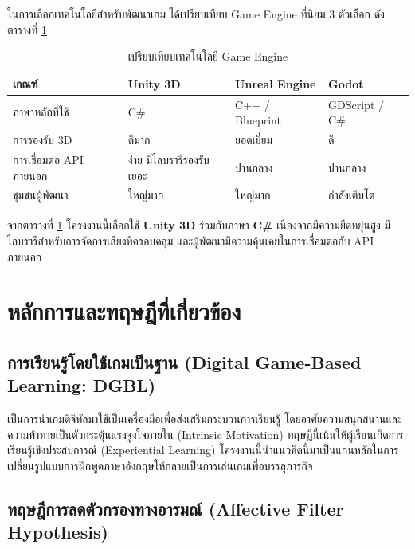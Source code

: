 {\sloppy
ในการเลือกเทคโนโลยีสำหรับพัฒนาเกม ได้เปรียบเทียบ Game Engine ที่นิยม 3 ตัวเลือก ดังตารางที่ \ref{tab:compare_engine}
}

\begin{table}[H]
\centering
\caption{เปรียบเทียบเทคโนโลยี Game Engine}
\label{tab:compare_engine}
\begin{tabular}{|p{3cm}|p{3.5cm}|p{3.5cm}|p{3cm}|}
\hline
\textbf{เกณฑ์} & \textbf{Unity 3D} & \textbf{Unreal Engine} & \textbf{Godot} \\
\hline
ภาษาหลักที่ใช้ & C\# & C++ / Blueprint & GDScript / C\# \\ \hline
การรองรับ 3D & ดีมาก & ยอดเยี่ยม & ดี \\ \hline
การเชื่อมต่อ API ภายนอก & ง่าย มีไลบรารีรองรับเยอะ & ปานกลาง & ปานกลาง \\ \hline
ชุมชนผู้พัฒนา & ใหญ่มาก & ใหญ่มาก & กำลังเติบโต \\ \hline
\end{tabular}
\end{table}

จากตารางที่ \ref{tab:compare_engine} โครงงานนี้เลือกใช้ \textbf{Unity 3D} ร่วมกับภาษา \textbf{C\#} เนื่องจากมีความยืดหยุ่นสูง มีไลบรารีสำหรับการจัดการเสียงที่ครอบคลุม และผู้พัฒนามีความคุ้นเคยในการเชื่อมต่อกับ API ภายนอก

\section{หลักการและทฤษฎีที่เกี่ยวข้อง}

\subsection{การเรียนรู้โดยใช้เกมเป็นฐาน (Digital Game-Based Learning: DGBL)}

เป็นการนำเกมดิจิทัลมาใช้เป็นเครื่องมือเพื่อส่งเสริมกระบวนการเรียนรู้ โดยอาศัยความสนุกสนานและความท้าทายเป็นตัวกระตุ้นแรงจูงใจภายใน (Intrinsic Motivation) ทฤษฎีนี้เน้นให้ผู้เรียนเกิดการเรียนรู้เชิงประสบการณ์ (Experiential Learning) โครงงานนี้นำแนวคิดนี้มาเป็นแกนหลักในการเปลี่ยนรูปแบบการฝึกพูดภาษาอังกฤษให้กลายเป็นการเล่นเกมเพื่อบรรลุภารกิจ

\subsection{ทฤษฎีการลดตัวกรองทางอารมณ์ (Affective Filter Hypothesis)}

